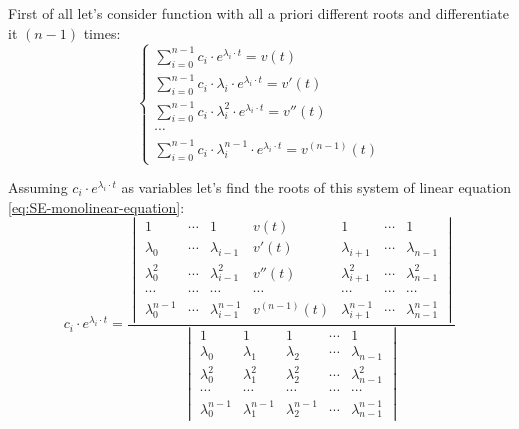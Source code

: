 \documentclass[a4paper, 11pt, oneside]{book}
\begin{document}
First of all let's consider function with all a priori different roots and differentiate it $(n - 1)$ times:
\begin{equation}\label{eq:SE-monolinear-equation}
  \begin{cases}
    \displaystyle \sum_{i = 0}^{n - 1} c_i \cdot e^{\lambda_i \cdot t} = v(t) \\
    \displaystyle \sum_{i = 0}^{n - 1} c_i \cdot \lambda_i \cdot e^{\lambda_i \cdot t} = v'(t) \\
    \displaystyle \sum_{i = 0}^{n - 1} c_i \cdot \lambda_i^2 \cdot e^{\lambda_i \cdot t} = v''(t) \\
    \cdots \\
    \displaystyle \sum_{i = 0}^{n - 1} c_i \cdot \lambda_i^{n - 1} \cdot e^{\lambda_i \cdot t} = v^{(n - 1)}(t)
  \end{cases}
\end{equation}

Assuming $c_i \cdot e^{\lambda_i \cdot t}$ as variables let's find the roots of this system of linear equation \ref{eq:SE-monolinear-equation}:
\begin{equation}\label{eq:SE-monolinear-equation-roots}
  c_i \cdot e^{\lambda_i \cdot t} = \frac{
  \begin{vmatrix}
    1 & \cdots & 1 & v(t) & 1 & \cdots & 1 \\
    \lambda_0 & \cdots & \lambda_{i-1} & v'(t) & \lambda_{i+1} & \cdots & \lambda_{n-1} \\
    \lambda_0^2 & \cdots & \lambda_{i-1}^2 & v''(t) & \lambda_{i+1}^2 & \cdots & \lambda_{n-1}^2 \\
    \cdots & \cdots & \cdots & \cdots & \cdots & \cdots & \cdots \\
    \lambda_0^{n-1} & \cdots & \lambda_{i-1}^{n-1} & v^{(n-1)}(t) & \lambda_{i+1}^{n-1} & \cdots & \lambda_{n-1}^{n-1}
  \end{vmatrix}
  }{
  \begin{vmatrix}
    1 & 1 & 1 & \cdots & 1 \\
    \lambda_0 & \lambda_1 & \lambda_2 & \cdots & \lambda_{n-1} \\
    \lambda_0^2 & \lambda_1^2 & \lambda_2^2 & \cdots & \lambda_{n-1}^2 \\
    \cdots & \cdots & \cdots & \cdots & \cdots \\
    \lambda_0^{n-1} & \lambda_1^{n-1} & \lambda_2^{n-1} & \cdots & \lambda_{n-1}^{n-1}
  \end{vmatrix}
  }
\end{equation}
\end{document}
